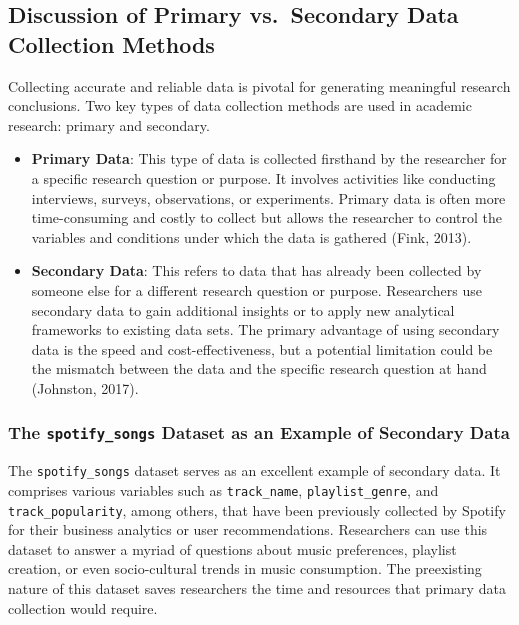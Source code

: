 \documentclass[
  b5paper]{book}
\begin{document}
\hypertarget{discussion-of-primary-vs.-secondary-data-collection-methods}{%
\subsection{Discussion of Primary vs.~Secondary Data Collection Methods}\label{discussion-of-primary-vs.-secondary-data-collection-methods}}

Collecting accurate and reliable data is pivotal for generating meaningful research conclusions. Two key types of data collection methods are used in academic research: primary and secondary.

\begin{itemize}
\item
  \textbf{Primary Data}: This type of data is collected firsthand by the researcher for a specific research question or purpose. It involves activities like conducting interviews, surveys, observations, or experiments. Primary data is often more time-consuming and costly to collect but allows the researcher to control the variables and conditions under which the data is gathered (Fink, 2013).
\item
  \textbf{Secondary Data}: This refers to data that has already been collected by someone else for a different research question or purpose. Researchers use secondary data to gain additional insights or to apply new analytical frameworks to existing data sets. The primary advantage of using secondary data is the speed and cost-effectiveness, but a potential limitation could be the mismatch between the data and the specific research question at hand (Johnston, 2017).
\end{itemize}

\hypertarget{the-spotify_songs-dataset-as-an-example-of-secondary-data}{%
\subsubsection{\texorpdfstring{The \texttt{spotify\_songs} Dataset as an Example of Secondary Data}{The spotify\_songs Dataset as an Example of Secondary Data}}\label{the-spotify_songs-dataset-as-an-example-of-secondary-data}}

The \texttt{spotify\_songs} dataset serves as an excellent example of secondary data. It comprises various variables such as \texttt{track\_name}, \texttt{playlist\_genre}, and \texttt{track\_popularity}, among others, that have been previously collected by Spotify for their business analytics or user recommendations. Researchers can use this dataset to answer a myriad of questions about music preferences, playlist creation, or even socio-cultural trends in music consumption. The preexisting nature of this dataset saves researchers the time and resources that primary data collection would require.
\end{document}
